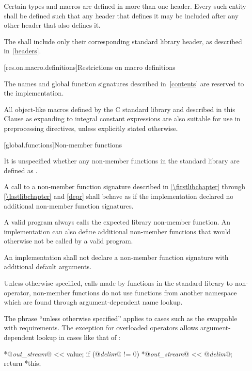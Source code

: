\pnum
Certain types and macros are defined in more than one header.
Every such entity shall be defined such that any header that defines it may be
included after any other header that also defines it.

\pnum
The 
shall include only their corresponding \Cpp{} standard library header,
as described in~\ref{headers}.

[res.on.macro.definitions]{Restrictions on macro definitions}
%

\pnum
The names and global function signatures described in~\ref{contents} are
reserved to the implementation.
%
%
%
%
%

\pnum
All object-like macros defined by the C standard library and described in this
Clause as expanding to integral constant expressions are also suitable for use
in  preprocessing directives, unless
explicitly stated otherwise.

[global.functions]{Non-member functions}

\pnum
It is unspecified whether any
non-member
functions in the \Cpp{} standard library are defined as
.

\pnum
A call to a non-member function signature
described in \ref{\firstlibchapter} through \ref{\lastlibchapter} and
\ref{depr} shall behave as if the implementation declared no additional
non-member function signatures.
\begin{footnote}
A valid \Cpp{} program always
calls the expected library non-member function. An implementation can
also define additional non-member functions that would otherwise not
be called by a valid \Cpp{} program.
\end{footnote}

\pnum
An implementation shall not declare a non-member function signature
with additional default arguments.

\pnum
Unless otherwise specified,
calls made by functions in the standard library to non-operator, non-member functions
do not use functions from another namespace which are found through
argument-dependent name lookup.
\begin{note}
The phrase ``unless otherwise specified'' applies to cases such as
the swappable with requirements.
The exception for overloaded operators allows argument-dependent lookup
in cases like that of
:

\effects
\begin{codeblock}
*@\textit{out_stream}@ << value;
if (@\textit{delim}@ != 0)
  *@\textit{out_stream}@ << @\textit{delim}@;
return *this;
\end{codeblock}
\end{note}

